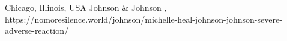           {Chicago, Illinois, USA}
          {}
          {Johnson \& Johnson}
          {}
          {
            ,
          }
          {https://nomoresilence.world/johnson/michelle-heal-johnson-johnson-severe-adverse-reaction/}

